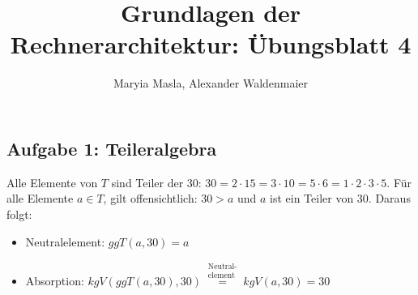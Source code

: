 \documentclass{article}
\title{Grundlagen der Rechnerarchitektur: Übungsblatt 4}
\author{Maryia Masla, Alexander Waldenmaier}
\begin{document}
    \maketitle

	\subsection*{Aufgabe 1: Teileralgebra}
	Alle Elemente von $T$ sind Teiler der 30: $30 = 2\cdot 15 = 3 \cdot 10 = 5 \cdot 6 = 1 \cdot 2 \cdot 3 \cdot 5$. Für alle Elemente $a \in T$, gilt offensichtlich: $30>a$ und $a$ ist ein Teiler von 30. Daraus folgt: 
	\begin{itemize}
		\item Neutralelement: $ggT(a, 30) = a$
		\item Absorption: $kgV(ggT(a, 30), 30) \stackrel{\substack{\text{Neutral-} \\ \text{element}}}{=} kgV(a, 30) = 30$
	\end{itemize}
	
\end{document}
